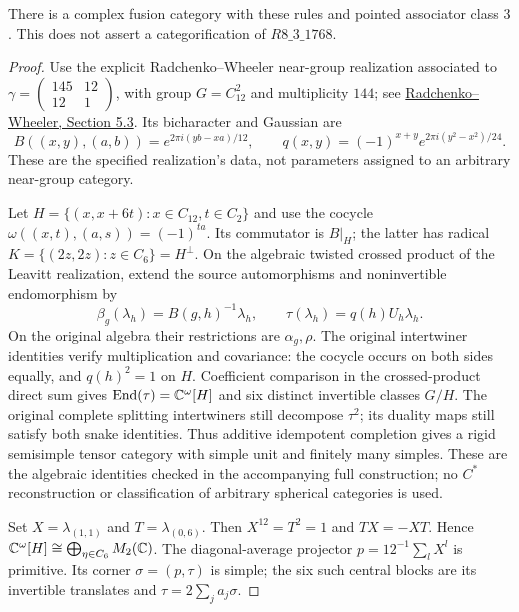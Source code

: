 \begin{proposition}
There is a complex fusion category with these rules and pointed
associator class $3$. This does not assert a categorification of
$R8\_3\_1768$.
\end{proposition}
\begin{proof}
Use the explicit Radchenko--Wheeler near-group realization associated
to $\gamma=\left(\begin{smallmatrix}145&12\\12&1\end{smallmatrix}\right)$,
with group $G=C_{12}^2$ and multiplicity $144$; see
\href{https://arxiv.org/abs/2609.21892}{Radchenko--Wheeler, Section 5.3}.
Its bicharacter and Gaussian are
\[
 B((x,y),(a,b))=e^{2\pi i(yb-xa)/12},\qquad
 q(x,y)=(-1)^{x+y}e^{2\pi i(y^2-x^2)/24}.
\]
These are the specified realization's data, not parameters assigned to
an arbitrary near-group category.

Let $H=\{(x,x+6t):x\in C_{12},t\in C_2\}$ and use the cocycle
$\omega((x,t),(a,s))=(-1)^{ta}$. Its commutator is $B|_H$;
the latter has radical $K=\{(2z,2z):z\in C_6\}=H^\perp$.
On the algebraic twisted crossed product of the Leavitt realization,
extend the source automorphisms and noninvertible endomorphism by
\[
 \beta_g(\lambda_h)=B(g,h)^{-1}\lambda_h,
 \qquad \tau(\lambda_h)=q(h)U_h\lambda_h.
\]
On the original algebra their restrictions are $\alpha_g,\rho$.
The original intertwiner identities verify multiplication and covariance:
the cocycle occurs on both sides equally, and $q(h)^2=1$ on $H$.
Coefficient comparison in the crossed-product direct sum gives
$\operatorname{End}(\tau)=\mathbb C^\omega[H]$ and six distinct invertible
classes $G/H$. The original complete splitting intertwiners still
decompose $\tau^2$; its duality maps still satisfy both snake identities.
Thus additive idempotent completion gives a rigid semisimple tensor
category with simple unit and finitely many simples. These are the
algebraic identities checked in the accompanying full construction;
no $C^*$ reconstruction or classification of arbitrary spherical
categories is used.

Set $X=\lambda_{(1,1)}$ and $T=\lambda_{(0,6)}$. Then
$X^{12}=T^2=1$ and $TX=-XT$. Hence
$\mathbb C^\omega[H]\cong\bigoplus_{\eta\in C_6}M_2(\mathbb C)$.
The diagonal-average projector
$p=12^{-1}\sum_lX^l$ is primitive. Its corner
$\sigma=(p,\tau)$ is simple; the six such central blocks are its
invertible translates and $\tau=2\sum_j a_j\sigma$.


\end{proof}
